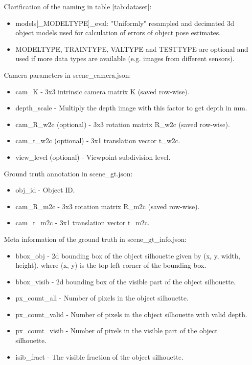 \documentclass[12pt,DIV14,BCOR12mm,a4paper,footinclude=false,headinclude,parskip=half-,twoside,openright,cleardoublepage=empty,toc=index,bibliography=totoc,listof=totoc]{scrreprt}
\numberwithin{equation}{chapter}
\begin{document}
Clarification of the naming in table \ref{tab:dataset}:
\begin{itemize}
  \item models[\_MODELTYPE]\_eval: "Uniformly" resampled and decimated \gls{3d} object models used for calculation of errors of object pose estimates.
  \item MODELTYPE, TRAINTYPE, VALTYPE and TESTTYPE are optional and used if more data types are available (e.g. images from different sensors).
\end{itemize}
Camera parameters in scene\_camera.json:
\begin{itemize}
  \item cam\_K - 3x3 intrinsic camera matrix K (saved row-wise).
  \item depth\_scale - Multiply the depth image with this factor to get depth in mm.
  \item cam\_R\_w2c (optional) - 3x3 rotation matrix R\_w2c (saved row-wise).
  \item cam\_t\_w2c (optional) - 3x1 translation vector t\_w2c.
  \item view\_level (optional) - Viewpoint subdivision level.
\end{itemize}
Ground truth annotation in scene\_gt.json:
\begin{itemize}
  \item obj\_id - Object ID.
  \item cam\_R\_m2c - 3x3 rotation matrix R\_m2c (saved row-wise).
  \item cam\_t\_m2c - 3x1 translation vector t\_m2c.
\end{itemize}
Meta information of the ground truth in scene\_gt\_info.json:
\begin{itemize}
  \item bbox\_obj - \gls{2d} bounding box of the object silhouette given by (x, y, width, height), where (x, y) is the top-left corner of the bounding box.
  \item bbox\_visib - \gls{2d} bounding box of the visible part of the object silhouette.
  \item px\_count\_all - Number of pixels in the object silhouette.
  \item px\_count\_valid - Number of pixels in the object silhouette with valid depth.
  \item px\_count\_visib - Number of pixels in the visible part of the object silhouette.
  \item isib\_fract - The visible fraction of the object silhouette.
\end{itemize}
\end{document}

